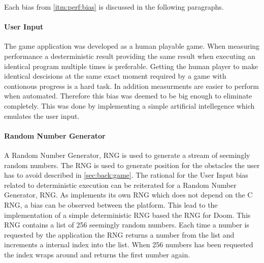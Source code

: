 Each bias from \autoref{itm:perf:bias} is discussed in the following paragraphs.

\paragraph{User Input} The game application was developed as a human playable game.
When measuring performance a desterministic result providing the same result when executing an identical program multiple times is preferable.
Getting the human player to make identical descisions at the same exact moment required by a game with contionous progress is a hard task.
In addition measurments are easier to perform when automated.
Therefore this bias was deemed to be big enough to eliminate completely.
This was done by implementing a simple artificial intellegence which emulates the user input.

\paragraph{Random Number Generator}
A Random Number Generator, RNG is used to generate a stream of seemingly random numbers.
The RNG is used to generate position for the obstacles the user has to avoid described in \autoref{sec:back:game}.
The rational for the User Input bias related to deterministic execution can be reiterated for a Random Number Generator, RNG.
As \rust implements its own RNG which does not depend on the C RNG, a bias can be observed between the platform.
This lead to the implementation of a simple deterministic RNG based the RNG for Doom.
This RNG contains a list of 256 seemingly random numbers.
Each time a number is requested by the application the RNG returns a number from the list and increments a internal index into the list.
When 256 numbers has been requested the index wraps around and returns the first number again.

